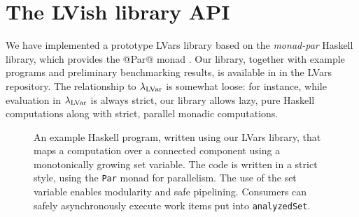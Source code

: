 \section{The LVish library API}\label{section:lvish-api}



We have implemented a prototype LVars library based on
the {\em monad-par} Haskell library, which provides the @Par@ monad \cite{monad-par}.
Our library, together with example programs and preliminary
benchmarking results, is available in in the LVars repository.
{The relationship to $\lambda_{\textrm{LVar}}$ is somewhat loose: for instance,
  while evaluation in $\lambda_{\textrm{LVar}}$ is always strict, our library allows
  lazy, pure Haskell computations along with strict, parallel monadic computations.}



\begin{figure}
  
  \caption{\footnotesize 
    An example Haskell program, written using our LVars library, that
    maps a computation over a connected component using a monotonically
    growing set variable.  The code is written in a strict style, using the \lstinline|Par|
    monad for parallelism.  The use of the set variable enables modularity and
    safe pipelining.  Consumers can safely asynchronously execute work items
    put into \lstinline|analyzedSet|.}
  \label{f:bfs-lvar}
\end{figure}



